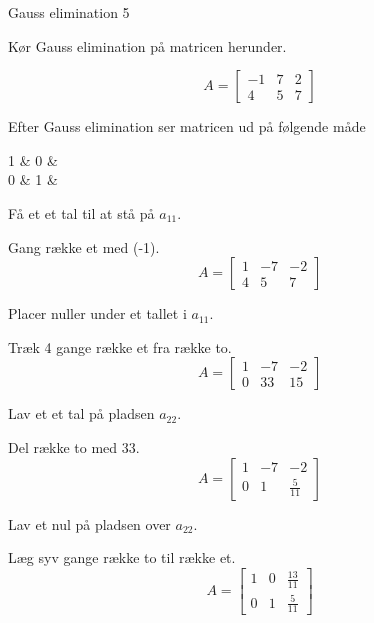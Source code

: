 \documentclass{article}
\begin{document}
\begin{exercise}{Gauss elimination 5}
	
	
	Kør Gauss elimination på matricen herunder.
	
	\[
	A = \left[\begin{array}{rr|r}
	-1 & 7 & 2 \\ 
	4 & 5 & 7
	\end{array} \right]
	\]
	
	Efter Gauss elimination ser matricen ud på følgende måde
	\begin{answermatrix}
		1 & 0 &  \\
		0 & 1 & 
	\end{answermatrix}
	
	\hint
	Få et et tal til at stå på $a_{11}$.
	
	\hint
	Gang række et med (-1).
	\[
	A = \left[\begin{array}{rr|r}
	1 & -7 & -2 \\ 
	4 & 5 & 7
	\end{array} \right]
	\]
	
	\hint
	Placer nuller under et tallet i $a_{11}$.
	
	\hint
	Træk 4 gange række et fra række to.
	\[
	A = \left[\begin{array}{rr|r}
	1 & -7 & -2 \\ 
	0 & 33 & 15
	\end{array} \right]
	\]
	
	\hint
	Lav et et tal på pladsen $a_{22}$.
	
	\hint
	Del række to med $33$.
	\[
	A = \left[\begin{array}{rr|r}
	1 & -7 & -2 \\ 
	0 & 1 & \frac{5}{11}
	\end{array} \right]
	\]
	
	
	\hint
	Lav et nul på pladsen over $a_{22}$.
	
	\hint
	Læg syv gange række to til række et.
	\[
	A = \left[\begin{array}{rr|r}
	1 & 0 & \frac{13}{11} \\ 
	0 & 1 & \frac{5}{11}
	\end{array} \right]
	\]
	
	
\end{exercise}

\newpage
\end{document}
